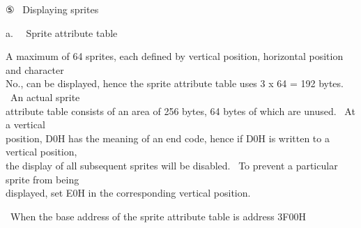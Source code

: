 \documentclass[a4paper,10pt]{article}
\begin{document}
\newpage

{}

\noindent ⑤ \ Displaying sprites

{}

\noindent a. \ \ Sprite attribute table\par
A maximum of 64 sprites, each defined by vertical position, horizontal position and character\\
No., can be displayed, hence the sprite attribute table uses 3 x 64 = 192 bytes. \ An actual sprite\\
attribute table consists of an area of 256 bytes, 64 bytes of which are unused. \ At a vertical\\
position, D0H has the meaning of an end code, hence if D0H is written to a vertical position,\\
the display of all subsequent sprites will be disabled. \ To prevent a particular sprite from being\\
displayed, set E0H in the corresponding vertical position.\par
\ When the base address of the sprite attribute table is address 3F00H
\end{document}
